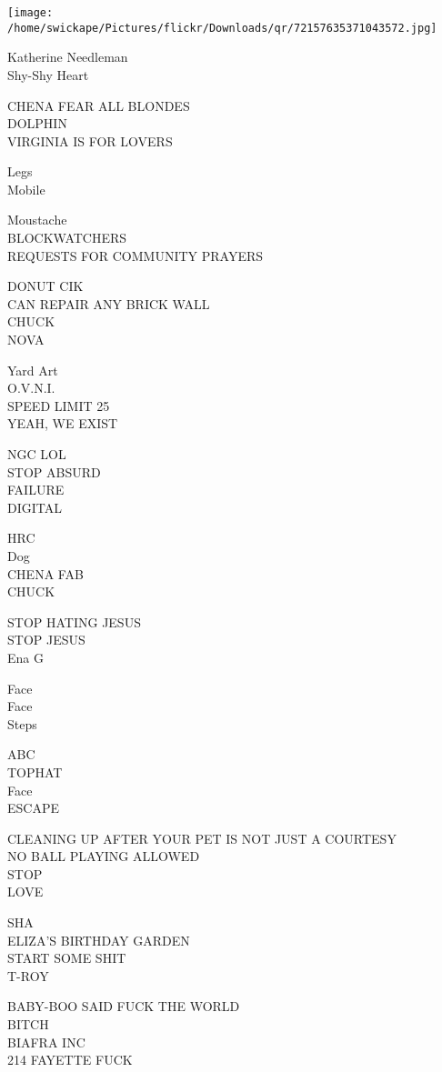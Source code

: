 \documentclass[10pt,letterpaper]{article}
\begin{document}
\texttt{[image: /home/swickape/Pictures/flickr/Downloads/qr/72157635371043572.jpg]}


Katherine Needleman\\
Shy{-}Shy Heart

CHENA FEAR ALL BLONDES\\
DOLPHIN\\
VIRGINIA IS FOR LOVERS

Legs\\
Mobile

Moustache\\
BLOCKWATCHERS\\
REQUESTS FOR COMMUNITY PRAYERS

DONUT CIK\\
CAN REPAIR ANY BRICK WALL\\
CHUCK\\
NOVA

Yard Art\\
O.V.N.I.\\
SPEED LIMIT 25\\
YEAH, WE EXIST

NGC LOL\\
STOP ABSURD\\
FAILURE\\
DIGITAL

HRC\\
Dog\\
CHENA FAB\\
CHUCK

STOP HATING JESUS\\
STOP JESUS\\
Ena G

Face\\
Face\\
Steps

ABC\\
TOPHAT\\
Face\\
ESCAPE

CLEANING UP AFTER YOUR PET IS NOT JUST A COURTESY\\
NO BALL PLAYING ALLOWED\\
STOP\\
LOVE

SHA\\
ELIZA'S BIRTHDAY GARDEN\\
START SOME SHIT\\
T{-}ROY

BABY{-}BOO SAID FUCK THE WORLD\\
BITCH\\
BIAFRA INC\\
214 FAYETTE FUCK
\end{document}
